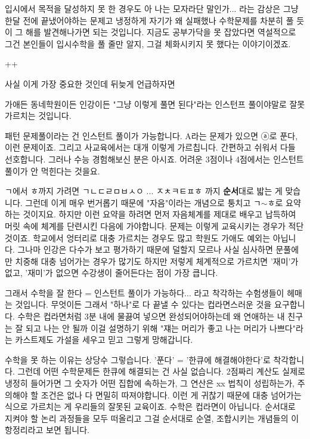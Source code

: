 입시에서 목적을 달성하지 못 한 경우도 아 나는 모자라단 말인가... 라는 감상은 그냥 한달 전에 끝냈어야하는 문제고
냉정하게 자기가 왜 실패했나 수학문제를 차분히 풀 듯이 그 해를 발견해나가면 되는 것입니다.
지금도 공부가닥을 못 잡았다면 역설적으로 그건 본인들이 입시수학을 풀 줄만 알지, 그걸 체화시키지 못 했다는 이야기이겠죠.
\vspace{5mm}

++
\vspace{5mm}

사실 이게 가장 중요한 것인데 뒤늦게 언급하자면
\vspace{5mm}

가애든 동네학원이든 인강이든
"그냥 이렇게 풀면 된다"라는 인스턴프 풀이야말로 잘못 가르치는 것입니다.
\vspace{5mm}

패턴 문제풀이라는 건 인스턴트 풀이가 가능합니다. A라는 문제가 있으면 ⓐ로 푼다, 이런 문제이죠.
그리고 사교육에서는 대개 이렇게 가르칩니다. 간편하고 쉬워서 다들 선호합니다.
그러나 수능 경험해보신 분은 아시죠. 어려운 3점이나 4점에서는 인스턴트 풀이가 안 먹힌다는 것을요.
\vspace{5mm}

ㄱ에서 ㅎ까지 가려면 ㄱㄴㄷㄹㅁㅂㅅㅇ ... ㅈㅊㅋㅌㅍㅎ 까지 \textbf{순서}대로 밟는 게 맞습니다.
그런데 이게 매우 번거롭기 때문에 "자음"이라는 개념으로 퉁치고 ㄱ$\sim$ㅎ로 요약하는 것이지요.
하지만 이런 요약을 하려면 먼저 자음체계를 제대로 배우고 납득하여 머릿 속에 체계를 단련시킨 다음에 가야합니다.
문제는 이렇게 교육시키는 경우가 적단 것이죠. 학교에서 엉터리로 대충 가르치는 경우도 많고 학원도 가애도 예외는 아닙니다.
그나마 인강은 다수가 보고 평가하기 때문에 덜할지 모르나 사실 심사하면 문풀에만 치중해 대충 넘어가는 경우가 많기도 하지만
저렇게 체계적으로 가르치면 '재미'가 없고, '재미'가 없으면 수강생이 줄어든다는 점이 가장 큽니다.
\vspace{5mm}

그래서 수학을 잘 한다 = 인스턴트 풀이가 가능하다... 라고 착각하는 수험생들이 헤매는 것입니다.
무엇이든 그래서 "하나"로 다 끝낼 수 있다는 컵라면스러운 것을 요구합니다.
수학은 컵라면처럼 3분 내에 물끓여 넣으면 완성되어야하는데 왜 연애하는 내 친구는 잘 되고 나는 안 될까
이걸 설명하기 위해 "쟤는 머리가 좋고 나는 머리가 나쁘다"라는 카스트제도 가설을 세우고 믿고 그렇게 망해갑니다.
\vspace{5mm}

수학을 못 하는 이유는 상당수 그렇습니다. '푼다' = '한큐에 해결해야한다'로 착각합니다.
그런데 어떤 수학문제든 한큐에 해결되는 건 사실 없습니다. 2점짜리 계산도 실제로 냉정히 들어가면
그 숫자가 어떤 집합에 속하는가, 그 연산은 xx 법칙이 성립하는가, 주의해야 할 조건은 없나 다 면밀히 따져야합니다.
이런 게 귀찮기 때문에 대충 넘어가는 식으로 가르치는 게 우리들의 잘못된 교육이죠.
수학은 컵라면이 아닙니다.
순서대로 지켜야 할 논리 과정들을 모두 떠올리고 그걸 순서대로 순열, 조합시키는 개념들의 이항정리라고 보면 됩니다.
\vspace{5mm}

